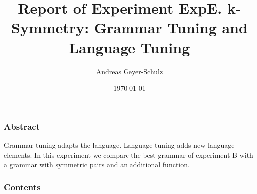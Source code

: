 \documentclass[18pt,c]{beamer}
\makeatletter
\let\beamer@writeslidentry@miniframeson=\beamer@writeslidentry
\newcommand*{\miniframeson}{\let\beamer@writeslidentry=\beamer@writeslidentry@miniframeson}
\makeatother
\begin{document}
\title{Report of Experiment ExpE. k-Symmetry: Grammar Tuning and Language Tuning}
\author{Andreas Geyer-Schulz}
\date{\today}
\begin{frame}
\titlepage
\end{frame}
\begin{frame}
\frametitle{Abstract}
Grammar tuning adapts the language. Language tuning adds new language elements. In this experiment we compare the best grammar of experiment B with a grammar with symmetric pairs and an additional function.%
\end{frame}
\begin{frame}[t, allowframebreaks]
\frametitle{Contents}
\tableofcontents[subsubsectionstyle=hide]
\vfill
\end{frame}
\miniframeson
\end{document}
